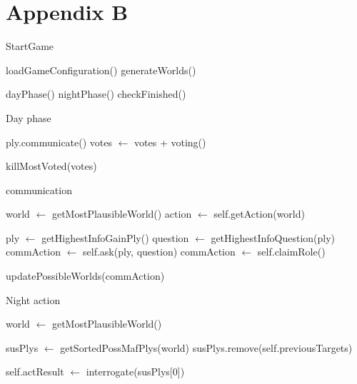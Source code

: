 \section{Appendix B}\label{app:B}
\begin{algorithm}
	\caption{StartGame}
	\begin{algorithmic}[1]
		\State loadGameConfiguration()
		\State generateWorlds()

		\State dayPhase()
		\State nightPhase()
		\State checkFinished()
		\EndWhile
		\EndFunction
	\end{algorithmic}
\end{algorithm}

\begin{algorithm}
	\caption{Day phase}
	\begin{algorithmic}[1]
		\State ply.communicate()
		\State votes $\gets$ votes + voting()
		\EndFor

		\State killMostVoted(votes)
		\EndFunction
	\end{algorithmic}
\end{algorithm}

\begin{algorithm}
	\caption{communication}
	\begin{algorithmic}[1]
		\State world $\gets$ getMostPlausibleWorld()
		\State action $\gets$ self.getAction(world)

		\State ply $\gets$ getHighestInfoGainPly()
		\State question $\gets$ getHighestInfoQuestion(ply)
		\State commAction $\gets$ self.ask(ply, question)
		\State commAction $\gets$ self.claimRole()
		\EndIf

		\State updatePossibleWorlds(commAction)
		\EndFunction
	\end{algorithmic}
\end{algorithm}

\begin{algorithm}
	\caption{Night action}
	\begin{algorithmic}[1]
		\State world $\gets$ getMostPlausibleWorld()

		\State susPlys $\gets$ getSortedPossMafPlys(world)
		\State susPlys.remove(self.previousTargets)

		\State self.actResult $\gets$ interrogate(susPlys[0])
		\EndIf
		\EndFunction

		\Statex
	\end{algorithmic}
\end{algorithm}

